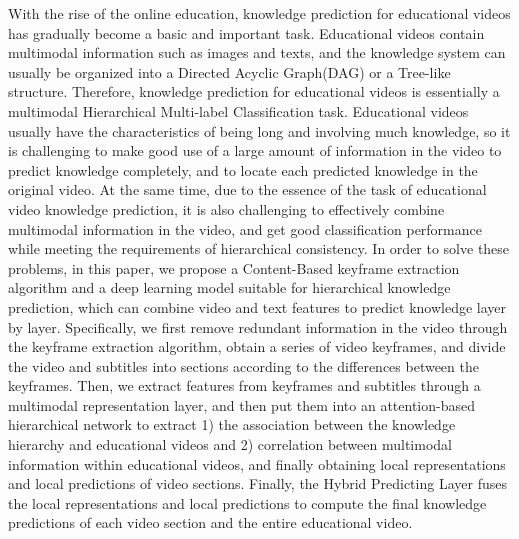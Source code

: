 \begin{abstract*}
    With the rise of the online education, knowledge prediction for educational videos has gradually become a basic and important task.
    Educational videos contain multimodal information such as images and texts, and the knowledge system can usually be organized into a Directed Acyclic Graph(DAG) or a Tree-like structure.
    Therefore, knowledge prediction for educational videos is essentially a multimodal Hierarchical Multi-label Classification task.
    Educational videos usually have the characteristics of being long and involving much knowledge,
    so it is challenging to make good use of a large amount of information in the video to predict knowledge completely, and to locate each predicted knowledge in the original video.
    At the same time, due to the essence of the task of educational video knowledge prediction,
    it is also challenging to effectively combine multimodal information in the video, and get good classification performance while meeting the requirements of hierarchical consistency.
    In order to solve these problems, in this paper, we propose a Content-Based keyframe extraction algorithm and a deep learning model suitable for hierarchical knowledge prediction,
    which can combine video and text features to predict knowledge layer by layer.
    Specifically, we first remove redundant information in the video through the keyframe extraction algorithm,
    obtain a series of video keyframes, and divide the video and subtitles into sections according to the differences between the keyframes.
    Then, we extract features from keyframes and subtitles through a multimodal representation layer, and then put them into an attention-based hierarchical network to extract
    1) the association between the knowledge hierarchy and educational videos and
    2) correlation between multimodal information within educational videos,
    and finally obtaining local representations and local predictions of video sections.
    Finally, the Hybrid Predicting Layer fuses the local representations and local predictions to compute the final knowledge predictions of each video section and the entire educational video.
\end{abstract*}
